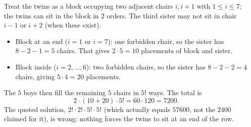 Treat the twins as a block occupying two adjacent chairs $i,i+1$ with $1\le i\le7$; the twins can sit in the block in $2$ orders. The third sister may not sit in chair $i-1$ or $i+2$ (when these exist).
\begin{itemize}
\item Block at an end ($i=1$ or $i=7$): one forbidden chair, so the sister has $8-2-1=5$ chairs. That gives $2\cdot5=10$ placements of block and sister.
\item Block inside ($i=2,\dots,6$): two forbidden chairs, so the sister has $8-2-2=4$ chairs, giving $5\cdot4=20$ placements.
\end{itemize}
The $5$ boys then fill the remaining $5$ chairs in $5!$ ways. The total is
\[
2\cdot(10+20)\cdot5!=60\cdot120=\boxed{7200}.
\]
The quoted solution, $2!\cdot2!\cdot5!\cdot5!$ (which actually equals $57600$, not the $2400$ claimed for it), is wrong: nothing forces the twins to sit at an end of the row.
